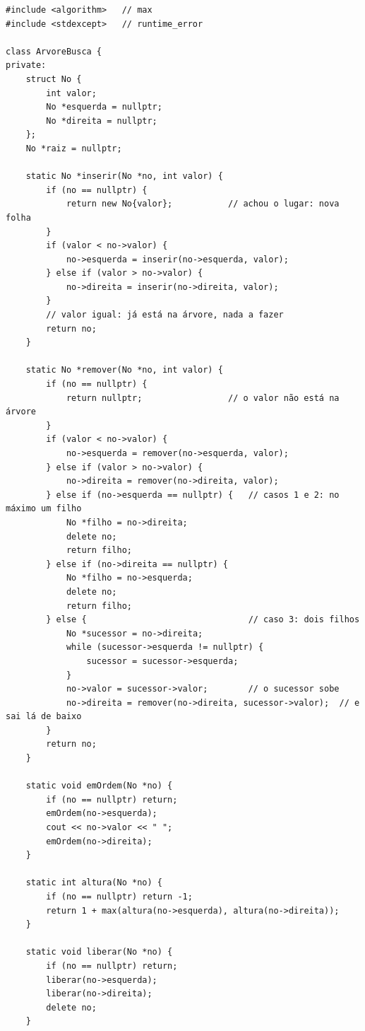 \begin{codigo}
\begin{Verbatim}[breaklines=true, breaksymbolleft={}, fontsize=\footnotesize]
#include <algorithm>   // max
#include <stdexcept>   // runtime_error

class ArvoreBusca {
private:
    struct No {
        int valor;
        No *esquerda = nullptr;
        No *direita = nullptr;
    };
    No *raiz = nullptr;

    static No *inserir(No *no, int valor) {
        if (no == nullptr) {
            return new No{valor};           // achou o lugar: nova folha
        }
        if (valor < no->valor) {
            no->esquerda = inserir(no->esquerda, valor);
        } else if (valor > no->valor) {
            no->direita = inserir(no->direita, valor);
        }
        // valor igual: já está na árvore, nada a fazer
        return no;
    }

    static No *remover(No *no, int valor) {
        if (no == nullptr) {
            return nullptr;                 // o valor não está na árvore
        }
        if (valor < no->valor) {
            no->esquerda = remover(no->esquerda, valor);
        } else if (valor > no->valor) {
            no->direita = remover(no->direita, valor);
        } else if (no->esquerda == nullptr) {   // casos 1 e 2: no máximo um filho
            No *filho = no->direita;
            delete no;
            return filho;
        } else if (no->direita == nullptr) {
            No *filho = no->esquerda;
            delete no;
            return filho;
        } else {                                // caso 3: dois filhos
            No *sucessor = no->direita;
            while (sucessor->esquerda != nullptr) {
                sucessor = sucessor->esquerda;
            }
            no->valor = sucessor->valor;        // o sucessor sobe
            no->direita = remover(no->direita, sucessor->valor);  // e sai lá de baixo
        }
        return no;
    }

    static void emOrdem(No *no) {
        if (no == nullptr) return;
        emOrdem(no->esquerda);
        cout << no->valor << " ";
        emOrdem(no->direita);
    }

    static int altura(No *no) {
        if (no == nullptr) return -1;
        return 1 + max(altura(no->esquerda), altura(no->direita));
    }

    static void liberar(No *no) {
        if (no == nullptr) return;
        liberar(no->esquerda);
        liberar(no->direita);
        delete no;
    }


\end{Verbatim}
\end{codigo}
